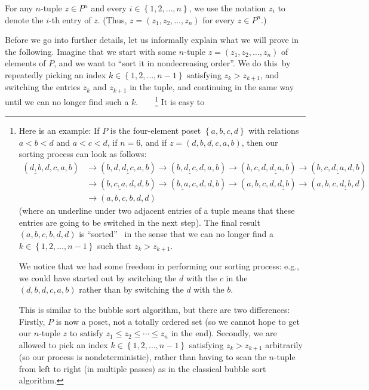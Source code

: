 \documentclass[numbers=enddot,12pt,final,onecolumn,notitlepage]{scrartcl}%
\theoremstyle{definition}
\begin{document}
For any $n$-tuple $z\in P^{n}$ and every $i\in\left\{  1,2,\ldots,n\right\}
$, we use the notation $z_{i}$ to denote the $i$-th entry of $z$. (Thus,
$z=\left(  z_{1},z_{2},\ldots,z_{n}\right)  $ for every $z\in P^{n}$.)

Before we go into further details, let us informally explain what we will
prove in the following. Imagine that we start with some $n$-tuple $z=\left(
z_{1},z_{2},\ldots,z_{n}\right)  $ of elements of $P$, and we want to
\textquotedblleft sort it in nondecreasing order\textquotedblright. We do
this\ by repeatedly picking an index $k\in\left\{  1,2,\ldots,n-1\right\}  $
satisfying $z_{k}>z_{k+1}$, and switching the entries $z_{k}$ and $z_{k+1}$ in
the tuple, and continuing in the same way until we can no longer find such a
$k$.\ \ \ \ \footnote{Here is an example: If $P$ is the four-element poset
$\left\{  a,b,c,d\right\}  $ with relations $a<b<d$ and $a<c<d$, if $n=6$, and
if $z=\left(  d,b,d,c,a,b\right)  $, then our sorting process can look as
follows:%
\begin{align*}
\left(  \underline{d,b},d,c,a,b\right)   &  \rightarrow\left(
b,d,\underline{d,c},a,b\right)  \rightarrow\left(  b,\underline{d,c}%
,d,a,b\right)  \rightarrow\left(  b,c,d,\underline{d,a},b\right)
\rightarrow\left(  b,c,\underline{d,a},d,b\right) \\
&  \rightarrow\left(  b,\underline{c,a},d,d,b\right)  \rightarrow\left(
\underline{b,a},c,d,d,b\right)  \rightarrow\left(  a,b,c,d,\underline{d,b}%
\right)  \rightarrow\left(  a,b,c,\underline{d,b},d\right) \\
&  \rightarrow\left(  a,b,c,b,d,d\right)
\end{align*}
(where an underline under two adjacent entries of a tuple means that these
entries are going to be switched in the next step). The final result
$\left(  a,b,c,b,d,d\right)  $ is \textquotedblleft sorted\textquotedblright%
\ in the sense that we can no longer find a $k\in\left\{  1,2,\ldots
,n-1\right\}  $ such that $z_{k}>z_{k+1}$.
\par
We notice that we had some freedom in performing our sorting process: e.g., we
could have started out by switching the $d$ with the $c$ in the $\left(
d,b,d,c,a,b\right)  $ rather than by switching the $d$ with the $b$.
\par
This is similar to the bubble sort algorithm, but there are two differences:
Firstly, $P$ is now a poset, not a totally ordered set (so we cannot hope to
get our $n$-tuple $z$ to satisfy $z_{1}\leq z_{2}\leq\cdots\leq z_{n}$ in the
end). Secondly, we are allowed to pick an index $k\in\left\{  1,2,\ldots
,n-1\right\}  $ satisfying $z_{k}>z_{k+1}$ arbitrarily (so our process is
nondeterministic), rather than having to scan the $n$-tuple from left to right
(in multiple passes) as in the classical bubble sort algorithm.} It is easy to
\end{document}
